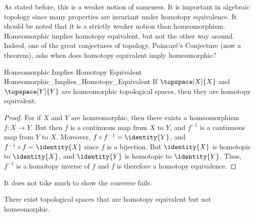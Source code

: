 \documentclass[oneside]{book}                                                  %
\begin{document}
                As stated before, this is a weaker notion of sameness. It is
                important in algebraic topology since many properties are
                invariant under homotopy equivalence. It should be noted that it
                is a strictly weaker notion than homeomorphism. Homeomorphic
                implies homotopy equivalent, but not the other way around.
                Indeed, one of the great conjectures of topology,
                Poincar\'{e}'s Conjecture (now a theorem), asks when does
                homotopy equivalent imply homeomorphic?
                \begin{ltheorem}{Homeomorphic Implies Homotopy Equivalent}
                                {Homeomorphic_Implies_Homotopy_Equivalent}
                    If $\topspace[X]{X}$ and $\topspace[Y]{Y}$ are homeomorphic
                    topological spaces, then they are homotopy equivalent.
                \end{ltheorem}
                \begin{proof}
                    For if $X$ and $Y$ are homeomorphic, then there exists a
                    homeomorphism $f:X\rightarrow{Y}$. But then $f$ is a
                    continuous map from $X$ to $Y$, and $f^{-1}$ is a continuous
                    map from $Y$ to $X$. Moreover,
                    ${f}\circ{f^{-1}}=\identity{Y}$, and
                    ${f^{-1}}\circ{f}=\identity{X}$ since $f$ is a bijection.
                    But $\identity{X}$ is homotopic to $\identity{X}$, and
                    $\identity{Y}$ is homotopic to $\identity{Y}$. Thus,
                    $f^{\minus{1}}$ is a homotopy inverse of $f$ and $f$ is
                    therefore a homotopy equivalence.
                \end{proof}
                It does not take much to show the converse fails.
                \begin{theorem}
                    \label{thm:homotopic_does_not_imply_homeomorphic}%
                    There exist topological spaces that are homotopy equivalent
                    but not homeomorphic.
                \end{theorem}
\end{document}
